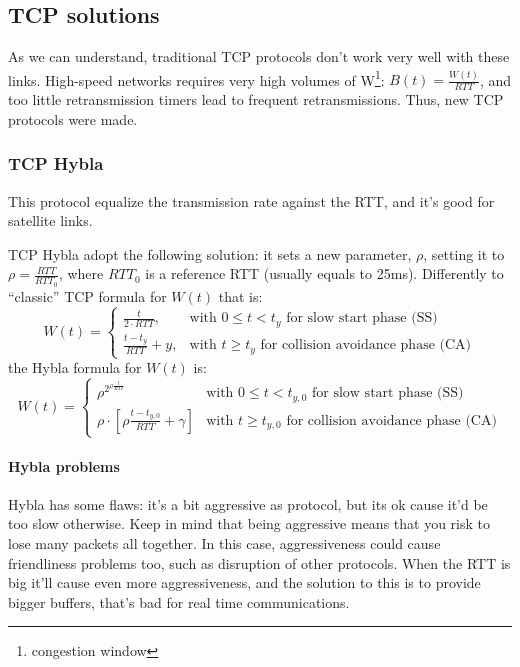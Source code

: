 \subsection{TCP solutions}

As we can understand, traditional TCP protocols don't work very well with these
links. High-speed networks requires very high volumes of W\footnote{congestion
window}: $B(t) = \frac{W(t)}{RTT}$, and too little retransmission timers lead
to frequent retransmissions.
Thus, new TCP protocols were made.

\subsubsection{TCP Hybla}
\label{prt:tcp:hybla}

This protocol equalize the transmission rate against the RTT, and it's good for
satellite links.

TCP Hybla adopt the following solution: it sets a new parameter, $\rho$,
setting it to $\rho = \frac{RTT}{RTT_0}$, where $RTT_0$ is a reference RTT
(usually equals to 25ms).
Differently to ``classic'' TCP formula for $W(t)$ that is:
\begin{equation*}
  W(t) = \begin{cases}
    \frac{t}{2 \cdot RTT}, & \mbox{with } 0 \le t < t_y \mbox{ for slow start phase (SS)} \\
    \frac{t - t_y}{RTT} + y, & \mbox{with } t \ge t_y \mbox{ for collision avoidance phase (CA)}
  \end{cases}
\end{equation*}
the Hybla formula for $W(t)$ is:
\begin{equation}
  W(t) = \begin{cases}
    \rho^{2^{\rho \frac{t}{RTT}}} & \mbox{with } 0 \le t < t_{y,0} \mbox{ for slow start phase (SS)} \\
    \rho \cdot \left [\rho\frac{t - t_{y,0}}{RTT} + \gamma \right ] & \mbox{with } t \ge t_{y,0} \mbox{ for collision avoidance phase (CA)}
    \end{cases}
\end{equation}

\paragraph*{Hybla problems} Hybla has some flaws: it's a bit aggressive as
protocol, but its ok cause it'd be too slow otherwise. Keep in mind that being
aggressive means that you risk to lose many packets all together. In this case,
aggressiveness could cause friendliness problems too, such as disruption of
other protocols.
When the RTT is big it'll cause even more aggressiveness, and the solution to
this is to provide bigger buffers, that's bad for real time communications.

